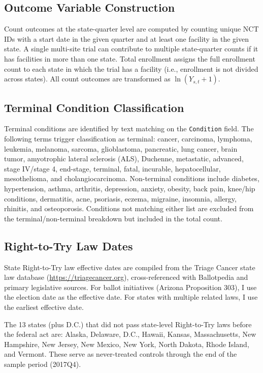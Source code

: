 \documentclass[12pt]{article}
\begin{document}
\subsection{Outcome Variable Construction}

Count outcomes at the state-quarter level are computed by counting unique NCT IDs with a start date in the given quarter and at least one facility in the given state. A single multi-site trial can contribute to multiple state-quarter counts if it has facilities in more than one state. Total enrollment assigns the full enrollment count to each state in which the trial has a facility (i.e., enrollment is not divided across states). All count outcomes are transformed as $\ln(Y_{s,t} + 1)$.

\subsection{Terminal Condition Classification}

Terminal conditions are identified by text matching on the \texttt{Condition} field. The following terms trigger classification as terminal: cancer, carcinoma, lymphoma, leukemia, melanoma, sarcoma, glioblastoma, pancreatic, lung cancer, brain tumor, amyotrophic lateral sclerosis (ALS), Duchenne, metastatic, advanced, stage IV/stage 4, end-stage, terminal, fatal, incurable, hepatocellular, mesothelioma, and cholangiocarcinoma. Non-terminal conditions include diabetes, hypertension, asthma, arthritis, depression, anxiety, obesity, back pain, knee/hip conditions, dermatitis, acne, psoriasis, eczema, migraine, insomnia, allergy, rhinitis, and osteoporosis. Conditions not matching either list are excluded from the terminal/non-terminal breakdown but included in the total count.

\subsection{Right-to-Try Law Dates}

State Right-to-Try law effective dates are compiled from the Triage Cancer state law database (\url{https://triagecancer.org}), cross-referenced with Ballotpedia and primary legislative sources. For ballot initiatives (Arizona Proposition 303), I use the election date as the effective date. For states with multiple related laws, I use the earliest effective date.

The 13 states (plus D.C.) that did not pass state-level Right-to-Try laws before the federal act are: Alaska, Delaware, D.C., Hawaii, Kansas, Massachusetts, New Hampshire, New Jersey, New Mexico, New York, North Dakota, Rhode Island, and Vermont. These serve as never-treated controls through the end of the sample period (2017Q4).
\end{document}
